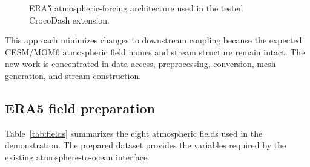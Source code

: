 \documentclass[11pt]{article}
\newcommand{\code}[1]{\texttt{#1}}
\begin{document}
\begin{figure}[htbp]
\centering
{}
\caption{ERA5 atmospheric-forcing architecture used in the tested CrocoDash extension.}
\label{fig:architecture}
\end{figure}

This approach minimizes changes to downstream coupling because the expected CESM/MOM6 atmospheric field names and stream structure remain intact. The new work is concentrated in data access, preprocessing, conversion, mesh generation, and stream construction.

\subsection{ERA5 field preparation}

Table~\ref{tab:fields} summarizes the eight atmospheric fields used in the demonstration. The prepared dataset provides the variables required by the existing atmosphere-to-ocean interface.
\end{document}
